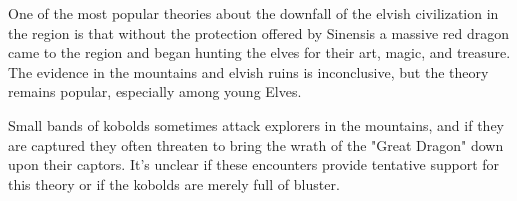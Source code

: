 One of the most popular theories about the downfall of the elvish civilization in the region is that without the protection offered by Sinensis a massive red dragon came to the region and began hunting the elves for their art, magic, and treasure.
The evidence in the mountains and elvish ruins is inconclusive, but the theory remains popular, especially among young Elves.

Small bands of kobolds sometimes attack explorers in the mountains, and if they are captured they often threaten to bring the wrath of the "Great Dragon" down upon their captors.
It's unclear if these encounters provide tentative support for this theory or if the kobolds are merely full of bluster.
